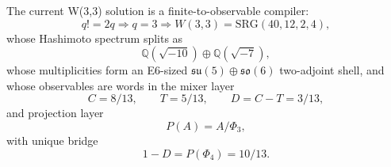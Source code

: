 \begin{theorem}
The current W(3,3) solution is a finite-to-observable compiler:
\[
q! = 2q \Rightarrow q=3 \Rightarrow W(3,3)=\mathrm{SRG}(40,12,2,4),
\]
whose Hashimoto spectrum splits as
\[
\mathbb Q(\sqrt{-10})\oplus\mathbb Q(\sqrt{-7}),
\]
whose multiplicities form an E6-sized
\(\mathfrak{su}(5)\oplus\mathfrak{so}(6)\) two-adjoint shell, and whose
observables are words in the mixer layer
\[
C=8/13, \qquad T=5/13, \qquad D=C-T=3/13,
\]
and projection layer
\[
P(A)=A/\Phi_3,
\]
with unique bridge
\[
1-D=P(\Phi_4)=10/13.
\]
\end{theorem}

